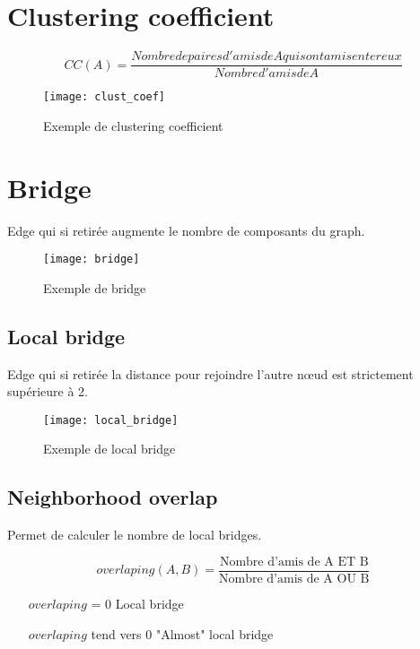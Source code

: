 \section{Clustering coefficient}

\begin{equation}
	CC(A) = \frac{Nombre de paires d'amis de A qui sont amis enter eux}{Nombre d'amis de A}
\end{equation}

\begin{figure}[H]
    \centering
    \texttt{[image: clust\_coef]}
    \caption{Exemple de clustering coefficient}
\end{figure}

\section{Bridge}

Edge qui si retirée augmente le nombre de composants du graph.

\begin{figure}[H]
    \centering
    \texttt{[image: bridge]}
    \caption{Exemple de bridge}
\end{figure}

\subsection{Local bridge}

Edge qui si retirée la distance pour rejoindre l'autre nœud est strictement supérieure à 2.

\begin{figure}[H]
    \centering
    \texttt{[image: local\_bridge]}
    \caption{Exemple de local bridge}
\end{figure}

\subsection{Neighborhood overlap}

Permet de calculer le nombre de local bridges.

\begin{equation}
overlaping(A, B) = \frac{\text{Nombre d'amis de A ET B}}{\text{Nombre d'amis de A OU B}}
\end{equation}

\begin{itemize}
	\item[$overlaping$ = 0] Local bridge
	\item[$overlaping$ tend vers 0] "Almost" local bridge
\end{itemize}

